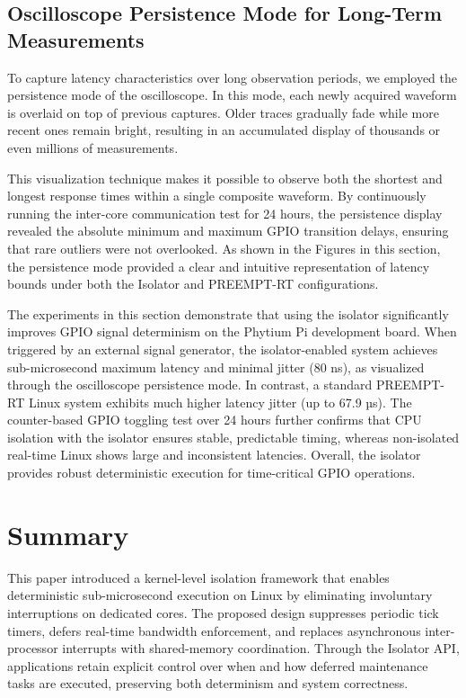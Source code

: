 \documentclass[letterpaper]{article}
\begin{document}
\subsection{Oscilloscope Persistence Mode for Long-Term Measurements}

To capture latency characteristics over long observation periods, we employed the persistence
mode of the oscilloscope. In this mode, each newly acquired waveform is overlaid on top of
previous captures. Older traces gradually fade while more recent ones remain bright, resulting
in an accumulated display of thousands or even millions of measurements.

This visualization technique makes it possible to observe both the shortest and longest response
times within a single composite waveform. By continuously running the inter-core communication
test for 24 hours, the persistence display revealed the absolute minimum and maximum GPIO
transition delays, ensuring that rare outliers were not overlooked. As shown in
the Figures in this section, the persistence mode provided
a clear and intuitive representation of latency bounds under both the Isolator and PREEMPT-RT
configurations.


The experiments in this section demonstrate that using the isolator significantly improves GPIO signal determinism on the Phytium Pi development board. When triggered by an external signal generator, the isolator-enabled system achieves sub-microsecond maximum latency and minimal jitter (80 ns), as visualized through the oscilloscope persistence mode. In contrast, a standard PREEMPT-RT Linux system exhibits much higher latency jitter (up to 67.9 µs). The counter-based GPIO toggling test over 24 hours further confirms that CPU isolation with the isolator ensures stable, predictable timing, whereas non-isolated real-time Linux shows large and inconsistent latencies. Overall, the isolator provides robust deterministic execution for time-critical GPIO operations.

\section{Summary}
This paper introduced a kernel-level isolation framework that enables deterministic sub-microsecond execution on Linux by eliminating involuntary interruptions on dedicated cores. The proposed design suppresses periodic tick timers, defers real-time bandwidth enforcement, and replaces asynchronous inter-processor interrupts with shared-memory coordination. Through the Isolator API, applications retain explicit control over when and how deferred maintenance tasks are executed, preserving both determinism and system correctness.
\end{document}
